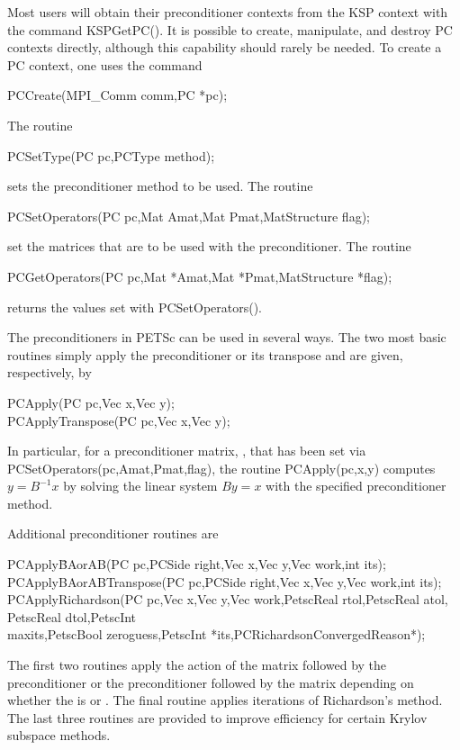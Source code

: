 {{{Most users will obtain their preconditioner contexts from the KSP
context with the command KSPGetPC(). It is possible to create,
manipulate, and destroy PC contexts directly, although this capability
should rarely be needed. To create a PC context, one uses the command
\begin{tabbing}
  PCCreate(MPI\_Comm comm,PC *pc);
\end{tabbing}
The routine
\begin{tabbing}
  PCSetType(PC pc,PCType method);
\end{tabbing}
sets the preconditioner method to be used.
The routine
\begin{tabbing}
  PCSetOperators(PC pc,Mat Amat,Mat Pmat,MatStructure flag);\\
\end{tabbing}
set the matrices that are to be used with
the preconditioner.
The routine
\begin{tabbing}
  PCGetOperators(PC pc,Mat *Amat,Mat *Pmat,MatStructure *flag);
\end{tabbing}
returns the values set with PCSetOperators().

The preconditioners in PETSc can be used in several ways.  The two
most basic routines simply apply the preconditioner or its transpose
and are given, respectively, by
\begin{tabbing}
  PCApply(PC pc,Vec x,Vec y);\\
  PCApplyTranspose(PC pc,Vec x,Vec y);
\end{tabbing}
In particular, for a preconditioner matrix, , that has
been set via PCSetOperators(pc,Amat,Pmat,flag),
the routine PCApply(pc,x,y) computes $y = B^{-1} x$
by solving the linear system $By = x$ with the specified preconditioner
method.

Additional preconditioner routines are
\begin{tabbing}
  PCApply\=BAorAB(PC pc,PCSide right,Vec x,Vec y,Vec work,int its);\\
  PCApplyBAorABTranspose(PC pc,PCSide right,Vec x,Vec y,Vec work,int its);\\
  PCApplyRichardson(PC pc,Vec x,Vec y,Vec work,PetscReal rtol,PetscReal atol, PetscReal dtol,PetscInt \\
   \>  maxits,PetscBool  zeroguess,PetscInt *its,PCRichardsonConvergedReason*);
\end{tabbing}
The first two routines apply the action of the matrix followed by the
preconditioner or the preconditioner followed by the matrix depending
on whether the   is
 or . The final routine applies  iterations of
Richardson's method.   
The last three routines are provided to improve
efficiency for certain Krylov subspace methods.

}}}
